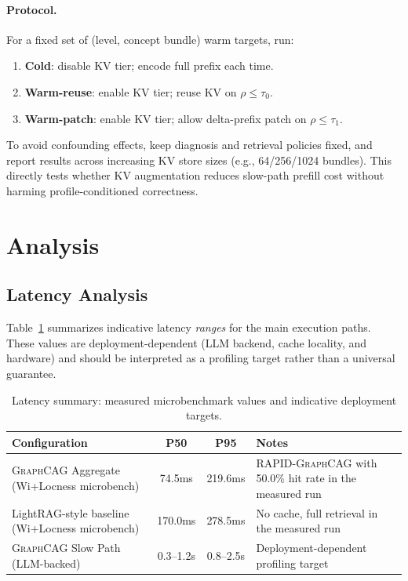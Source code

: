 \documentclass[11pt,a4paper,twocolumn]{article}
\newcommand{\graphcag}{\textsc{GraphCAG}}
\newcommand{\rapid}{\textsc{RAPID-GraphCAG}}
\begin{document}
\paragraph{Protocol.} For a fixed set of (level, concept bundle) warm targets, run:
\begin{enumerate}[leftmargin=*]
  \item \textbf{Cold}: disable KV tier; encode full prefix each time.
  \item \textbf{Warm-reuse}: enable KV tier; reuse KV on $\rho \le \tau_0$.
  \item \textbf{Warm-patch}: enable KV tier; allow delta-prefix patch on $\rho \le \tau_1$.
\end{enumerate}

To avoid confounding effects, keep diagnosis and retrieval policies fixed, and report results across increasing KV store sizes (e.g., 64/256/1024 bundles). This directly tests whether KV augmentation reduces slow-path prefill cost without harming profile-conditioned correctness.

\section{Analysis}
\label{sec:analysis}

\subsection{Latency Analysis}

Table~\ref{tab:latency} summarizes indicative latency \emph{ranges} for the main execution paths. These values are deployment-dependent (LLM backend, cache locality, and hardware) and should be interpreted as a profiling target rather than a universal guarantee.

\begin{table}[h]
\centering
\caption{Latency summary: measured microbenchmark values and indicative deployment targets.}
\label{tab:latency}
{\scriptsize
\setlength{\tabcolsep}{4pt}
\begin{tabularx}{\columnwidth}{@{}>{\raggedright\arraybackslash}X cc>{\raggedright\arraybackslash}X@{}}
\toprule
\textbf{Configuration} & \textbf{P50} & \textbf{P95} & \textbf{Notes} \\
\midrule
\graphcag{} Aggregate (Wi+Locness microbench) & 74.5ms   & 219.6ms  & \rapid{} with 50.0\% hit rate in the measured run \\
LightRAG-style baseline (Wi+Locness microbench) & 170.0ms  & 278.5ms  & No cache, full retrieval in the measured run \\
\graphcag{} Slow Path (LLM-backed) & 0.3--1.2s & 0.8--2.5s & Deployment-dependent profiling target \\
\bottomrule
\end{tabularx}
}
\end{table}
\end{document}
